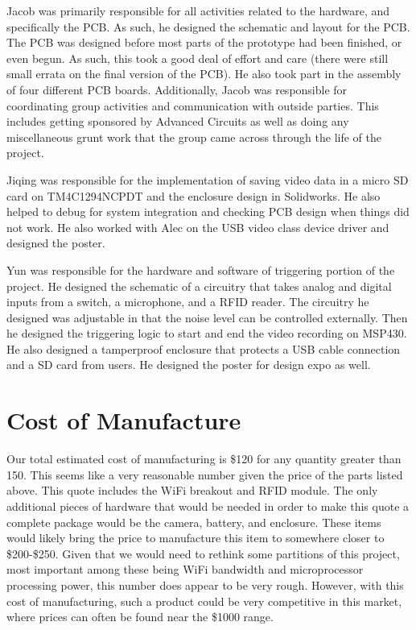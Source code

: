 \documentclass[12pt]{article}
\begin{document}
Jacob was primarily responsible for all activities related to the hardware, and
specifically the PCB. As such, he designed the schematic and layout for the
PCB. The PCB was designed before most parts of the prototype had been finished,
or even begun. As such, this took a good deal of effort and care (there were
still small errata on the final version of the PCB). He also took part in the
assembly of four different PCB boards. Additionally, Jacob was responsible for
coordinating group activities and communication with outside parties. This
includes getting sponsored by Advanced Circuits as well as doing any
miscellaneous grunt work that the group came across through the life of the
project.

Jiqing was responsible for the implementation of saving video data in a micro
SD card on TM4C1294NCPDT and the enclosure design in Solidworks. He also helped
to debug for system integration and checking PCB design when things did not
work. He also worked with Alec on the USB video class device driver and
designed the poster.

Yun was responsible for the hardware and software of triggering portion of the
project. He designed the schematic of a circuitry that takes analog and digital
inputs from a switch, a microphone, and a RFID reader. The circuitry he
designed was adjustable in that the noise level can be controlled externally.
Then he designed the triggering logic to start and end the video recording on
MSP430. He also designed a tamperproof enclosure that protects a USB cable
connection and a SD card from users. He designed the poster for design expo as
well.

\section{Cost of Manufacture}
Our total estimated cost of manufacturing is \$120 for any quantity greater
than 150. This seems like a very reasonable number given the price of the parts
listed above. This quote includes the WiFi breakout and RFID module. The only
additional pieces of hardware that would be needed in order to make this quote
a complete package would be the camera, battery, and enclosure. These items
would likely bring the price to manufacture this item to somewhere closer to
\$200-\$250. Given that we would need to rethink some partitions of this project,
most important among these being WiFi bandwidth and microprocessor processing
power, this number does appear to be very rough. However, with this cost of
manufacturing, such a product could be very competitive in this market, where
prices can often be found near the \$1000 range.
\end{document}
